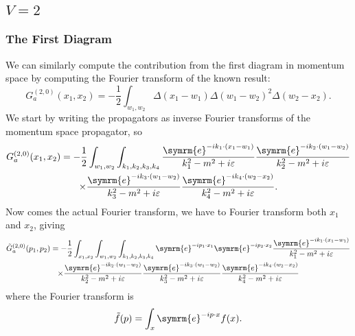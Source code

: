 \documentclass[fleqn]{NotesClass}
\newcommand{\e}{\symrm{e}}
\begin{document}
    \subsection{\texorpdfstring{\(V = 2\)}{V = 2}}
    \subsubsection{The First Diagram}
    We can similarly compute the contribution from the first diagram in momentum space by computing the Fourier transform of the known result:
    \begin{equation}
        G^{(2, 0)}_a(x_1, x_2) = -\frac{1}{2}\int_{w_1, w_2} \Delta(x_1 - w_1) \Delta(w_1 - w_2)^2 \Delta(w_2 - x_2).
    \end{equation}
    We start by writing the propagators as inverse Fourier transforms of the momentum space propagator, so
    \begin{multline}
        G^{(2, 0)}_a(x_1, x_2) = -\frac{1}{2}\int_{w_1, w_2} \int_{k_1, k_2, k_3, k_4} \frac{\e^{-ik_1 \cdot (x_1 - w_1)}}{k_1^2 - m^2 + i\varepsilon} \frac{\e^{-ik_2 \cdot (w_1 - w_2)}}{k_2^2 - m^2 + i\varepsilon}\\
        \times \frac{\e^{-ik_3 \cdot (w_1 - w_2)}}{k_3^2 - m^2 + i\varepsilon} \frac{\e^{-ik_4 \cdot (w_2 - x_2)}}{k_4^2 - m^2 + i\varepsilon}.
    \end{multline}
    Now comes the actual Fourier transform, we have to Fourier transform both \(x_1\) and \(x_2\), giving
    \begin{multline}
        \tilde{G}^{(2, 0)}_a(p_1, p_2) = -\frac{1}{2} \int_{x_1, x_2} \int_{w_1, w_2} \int_{k_1, k_2, k_3, k_4} \e^{-ip_1 \cdot x_1} \e^{-ip_2 \cdot x_2} \frac{\e^{-ik_1 \cdot (x_1 - w_1)}}{k_1^2 - m^2 + i\varepsilon} \\
        \times \frac{\e^{-ik_2 \cdot (w_1 - w_2)}}{k_2^2 - m^2 + i\varepsilon}
        \frac{\e^{-ik_3 \cdot (w_1 - w_2)}}{k_3^2 - m^2 + i\varepsilon} \frac{\e^{-ik_4 \cdot (w_2 - x_2)}}{k_4^2 - m^2 + i\varepsilon}
    \end{multline}
    where the Fourier transform is
    \begin{equation}
        \tilde{f}(p) = \int_x \e^{-ip\cdot x} f(x).
    \end{equation}
    
\end{document}
